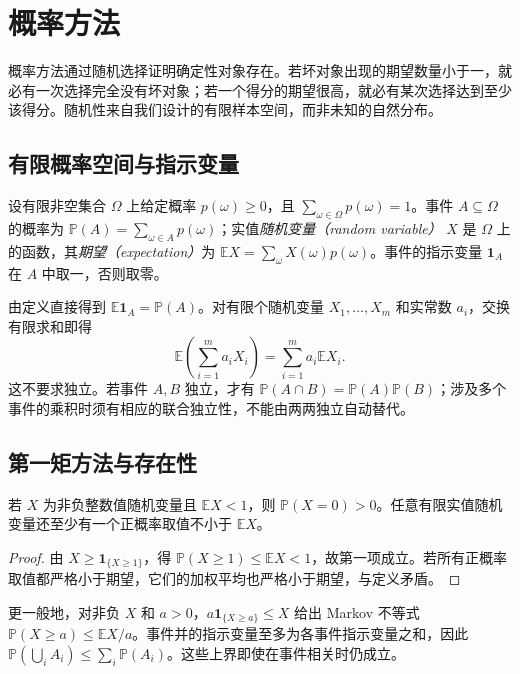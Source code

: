 \setcounter{chapter}{14} %
\chapter{概率方法}
\label{ch:probabilistic}

概率方法通过随机选择证明确定性对象存在。若坏对象出现的期望数量小于一，就必有一次选择完全没有坏对象；若一个得分的期望很高，就必有某次选择达到至少该得分。随机性来自我们设计的有限样本空间，而非未知的自然分布。

\section{有限概率空间与指示变量}

设有限非空集合 $\Omega$ 上给定概率 $p(\omega)\ge0$，且 $\sum_{\omega\in\Omega}p(\omega)=1$。事件 $A\subseteq\Omega$ 的概率为 $\mathbb P(A)=\sum_{\omega\in A}p(\omega)$；实值\emph{随机变量（random variable）} $X$ 是 $\Omega$ 上的函数，其\emph{期望（expectation）}为 $\mathbb E X=\sum_\omega X(\omega)p(\omega)$。事件的指示变量 $\mathbf1_A$ 在 $A$ 中取一，否则取零。

由定义直接得到 $\mathbb E\mathbf1_A=\mathbb P(A)$。对有限个随机变量 $X_1,\ldots,X_m$ 和实常数 $a_i$，交换有限求和即得
\[
 \mathbb E\left(\sum_{i=1}^m a_iX_i\right)=\sum_{i=1}^m a_i\mathbb E X_i.
\]
这不要求独立。若事件 $A,B$ 独立，才有 $\mathbb P(A\cap B)=\mathbb P(A)\mathbb P(B)$；涉及多个事件的乘积时须有相应的联合独立性，不能由两两独立自动替代。

\section{第一矩方法与存在性}

\begin{proposition}
若 $X$ 为非负整数值随机变量且 $\mathbb E X<1$，则 $\mathbb P(X=0)>0$。任意有限实值随机变量还至少有一个正概率取值不小于 $\mathbb E X$。
\end{proposition}
\begin{proof}
由 $X\ge\mathbf1_{\{X\ge1\}}$，得 $\mathbb P(X\ge1)\le\mathbb E X<1$，故第一项成立。若所有正概率取值都严格小于期望，它们的加权平均也严格小于期望，与定义矛盾。
\end{proof}

更一般地，对非负 $X$ 和 $a>0$，$a\mathbf1_{\{X\ge a\}}\le X$ 给出 Markov 不等式 $\mathbb P(X\ge a)\le\mathbb E X/a$。事件并的指示变量至多为各事件指示变量之和，因此 $\mathbb P(\bigcup_iA_i)\le\sum_i\mathbb P(A_i)$。这些上界即使在事件相关时仍成立。

